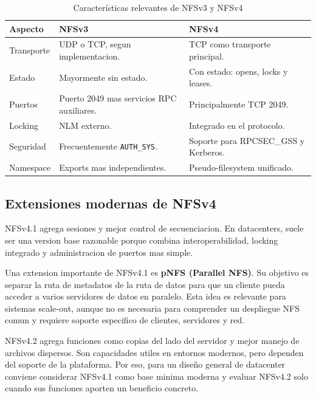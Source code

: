 \begin{table}[H]
    \centering
    \small
    \renewcommand{\arraystretch}{1.2}
    \begin{tabularx}{\textwidth}{L{3.0cm}YY}
        \toprule
        \textbf{Aspecto} & \textbf{NFSv3} & \textbf{NFSv4} \\
        \midrule
        Transporte & UDP o TCP, segun implementacion. & TCP como transporte principal. \\
        Estado & Mayormente sin estado. & Con estado: opens, locks y leases. \\
        Puertos & Puerto 2049 mas servicios RPC auxiliares. & Principalmente TCP 2049. \\
        Locking & NLM externo. & Integrado en el protocolo. \\
        Seguridad & Frecuentemente \texttt{AUTH\_SYS}. & Soporte para RPCSEC\_GSS y Kerberos. \\
        Namespace & Exports mas independientes. & Pseudo-filesystem unificado. \\
        \bottomrule
    \end{tabularx}
    \caption{Características relevantes de NFSv3 y NFSv4}
    \label{tab:nfsv3_nfsv4}
\end{table}

\subsection{Extensiones modernas de NFSv4}

NFSv4.1 agrega sesiones y mejor control de secuenciacion. En datacenters, suele ser una version base razonable porque combina interoperabilidad, locking integrado y administracion de puertos mas simple.

Una extension importante de NFSv4.1 es \textbf{pNFS (Parallel NFS)}. Su objetivo es separar la ruta de metadatos de la ruta de datos para que un cliente pueda acceder a varios servidores de datos en paralelo. Esta idea es relevante para sistemas scale-out, aunque no es necesaria para comprender un despliegue NFS comun y requiere soporte especifico de clientes, servidores y red.

NFSv4.2 agrega funciones como copias del lado del servidor y mejor manejo de archivos dispersos. Son capacidades utiles en entornos modernos, pero dependen del soporte de la plataforma. Por eso, para un diseño general de datacenter conviene considerar NFSv4.1 como base minima moderna y evaluar NFSv4.2 solo cuando sus funciones aporten un beneficio concreto.
